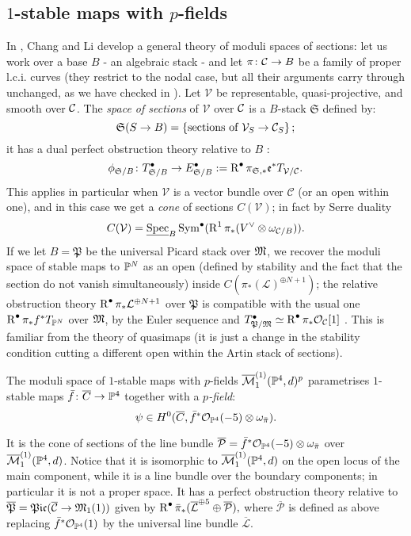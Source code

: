 \subsection{$1$-stable maps with $p$-fields} In \cite{CL-pfields}, Chang and Li develop a general theory of moduli spaces of sections: let us work over a base $B$ - an algebraic stack - and let $\pi\colon \mathcal{C}\rightarrow B$ be a family of proper l.c.i. curves (they restrict to the nodal case, but all their arguments carry through unchanged, as we have checked in \cite[\S 3]{BCM}). Let $\mathcal V$ be representable, quasi-projective, and smooth over $\mathcal{C}$. The \emph{space of sections} of $\mathcal V$ over $\mathcal{C}$ is a $B$-stack $\mathfrak S$ defined by:
 \[\mathfrak{S}(S\rightarrow B)=\left\{\text{sections of}\ \mathcal V_S\rightarrow\mathcal{C}_S\right\};\]
it has a dual perfect obstruction theory relative to $B$ \cite[Proposition 2.5]{CL-pfields}:
\[ \phi_{\mathfrak S/B}\colon T^{\bullet}_{\mathfrak S/B}\rightarrow E^{\bullet}_{\mathfrak S/B}:=\operatorname{R}^{\bullet}\pi_{\mathfrak S,*}\mathfrak e^* T_{\mathcal V/\mathcal{C}}.\]
This applies in particular when $\mathcal V$ is a vector bundle over $\mathcal C$ (or an open within one), and in this case we get a \emph{cone} of sections $C(\mathcal V)$; in fact by Serre duality \[C(\mathcal V)=\underline{\operatorname{Spec}}_B\operatorname{Sym}^\bullet(\operatorname{R}^1\pi_* (V^\vee\otimes \omega_{\mathcal C/B})).\] If we let $B=\mathfrak{P}$ be the universal Picard stack over $\mathfrak M$, we recover the moduli space of stable maps to $\mathbb P^N$ as an open (defined by stability and the fact that the section do not vanish simultaneously) inside $C(\pi_*(\mathcal L)^{\oplus N+1})$; the relative obstruction theory $\operatorname{R}^{\bullet}\pi_*\mathcal L^{\oplus N+1}$ over $\mathfrak{P}$ is compatible with the usual one $\operatorname{R}^{\bullet}\pi_*f^*T_{\mathbb P^N}$  over $\mathfrak M$, by the Euler sequence and $T^{\bullet}_{\mathfrak P/\mathfrak M}\simeq\operatorname{R}^{\bullet}\pi_*\mathcal{O}_{\mathcal C}[1]$ \cite[Lemma 2.8]{CL-pfields}. This is familiar from the theory of quasimaps (it is just a change in the stability condition cutting a different open within the Artin stack of sections).
\begin{dfn}
 The moduli space of $1$-stable maps with $p$-fields $\overline{\mathcal{M}}_1^{(1)}(\mathbb P^4,d)^p$ parametrises $1$-stable maps $\bar{f}\colon\overline{C}\rightarrow\mathbb P^4$ together with a \emph{$p$-field}: \[\psi \in  H^0(\overline{C},\bar{f}^*\mathcal{O}_{\mathbb P^4}(-5)\otimes\omega_{\bar{\pi}}).\]
\end{dfn}
 \noindent It is the cone of sections of the line bundle $\overline{\mathcal P}=\bar{f}^*\mathcal{O}_{\mathbb P^4}(-5)\otimes\omega_{\bar{\pi}}$ over $\overline{\mathcal{M}}_1^{(1)}(\mathbb P^4,d)$. Notice that it is isomorphic to $\overline{\mathcal{M}}_1^{(1)}(\mathbb P^4,d)$ on the open locus of the main component, while it is a line bundle over the boundary components; in particular it is not a proper space. It has a perfect obstruction theory relative to $\overline{\mathfrak P}=\mathfrak{Pic}(\overline{\mathcal C}\rightarrow\mathfrak M_1(1))$ given by $\operatorname{R}^{\bullet}\bar{\pi}_*(\overline{\mathcal L}^{\oplus 5}\oplus \overline{\mathcal P}),$
 where $\overline{\mathcal P}$ is defined as above replacing $\bar{f}^*\mathcal{O}_{\mathbb P^4}(1)$ by the universal line bundle $\overline{\mathcal L}$.

